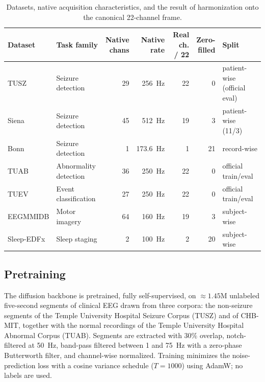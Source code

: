 \documentclass[journal]{IEEEtran}
\begin{document}
\begin{table}[t]
\centering
\caption{Datasets, native acquisition characteristics, and the result of
harmonization onto the canonical 22-channel frame.}
\label{tab:datasets}
\small
\begin{tabular}{@{}llrrrrl@{}}
\toprule
Dataset & Task family & \makecell[r]{Native\\chans} & \makecell[r]{Native\\rate} &
\makecell[r]{Real ch.\\/ 22} & \makecell[r]{Zero-\\filled} & Split \\
\midrule
TUSZ       & Seizure detection            & 29 & \SI{256}{\hertz} & 22 & 0  & patient-wise (official eval) \\
Siena      & Seizure detection            & 45 & \SI{512}{\hertz} & 19 & 3  & patient-wise (11/3) \\
Bonn       & Seizure detection            & 1  & \SI{173.6}{\hertz} & 1 & 21 & record-wise \\
TUAB       & Abnormality detection        & 36 & \SI{250}{\hertz} & 22 & 0  & official train/eval \\
TUEV       & Event classification         & 27 & \SI{250}{\hertz} & 22 & 0  & official train/eval \\
EEGMMIDB   & Motor imagery                & 64 & \SI{160}{\hertz} & 19 & 3  & subject-wise \\
Sleep-EDFx & Sleep staging                & 2  & \SI{100}{\hertz} & 2  & 20 & subject-wise \\
\bottomrule
\end{tabular}
\end{table}

\subsection{Pretraining}
\label{subsec:pretraining}
The diffusion backbone is pretrained, fully self-supervised, on
$\approx\!\num{1.45}$M unlabeled five-second segments of clinical EEG drawn from
three corpora: the non-seizure segments of the Temple University Hospital
Seizure Corpus (TUSZ) and of CHB-MIT, together with the normal recordings of the
Temple University Hospital Abnormal Corpus (TUAB). Segments are extracted with
$30\%$ overlap, notch-filtered at \SI{50}{\hertz}, band-pass filtered between
\SI{1}{} and \SI{75}{\hertz} with a zero-phase Butterworth filter, and
channel-wise normalized. Training minimizes the noise-prediction loss with a
cosine variance schedule ($T=1000$) using AdamW; no labels are used.
\end{document}
